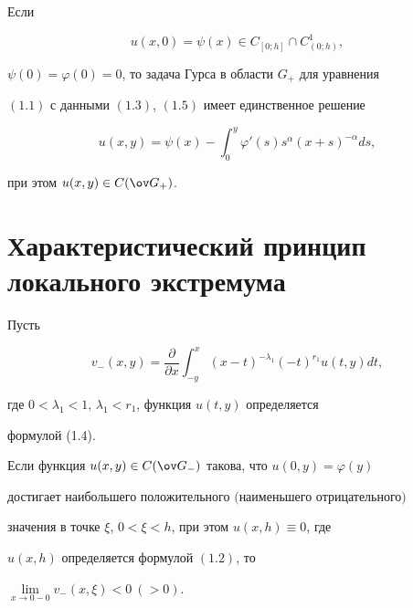  


\begin{thm} 


Если 


\begin{equation} 


u(x,0)=\psi(x)\in C_{[0;h]}\cap C^1_{(0;h)}, 


\end{equation} 


$\psi(0)=\varphi(0)=0$, то задача Гурса в области $G_+$ для уравнения 


$(1.1)$ с данными $(1.3)$, $(1.5)$ имеет единственное решение 


\begin{equation} 


u(x,y)=\psi(x)-\int^y_0 \varphi'(s)s^\alpha(x+s)^{-\alpha}d s, 


\end{equation} 


при этом $u(x,y)\in C(\ov G_+)$.\end{thm} 


 


\section{Характеристический принцип локального экстремума} 


 


Пусть 


$$ 


v_-(x,y)=\frac{\partial}{\partial x}\int^x_{-y} 


(x-t)^{-\lambda_1}(-t)^{r_1}u(t,y)d t, 


$$ 


где $0<\lambda_1<1$, $\lambda_1<r_1$, функция $u(t,y)$ определяется 


формулой (1.4). 


 


\begin{lem} 


Если функция $u(x,y)\in C(\ov G_-)$ такова, что $u(0,y)=\varphi(y)$ 


достигает наибольшего положительного $($наименьшего отрицательного$)$ 


значения в точке $\xi$, $0<\xi<h$, при этом $u(x,h)\equiv0$, где 


$u(x,h)$ определяется формулой $(1.2)$, то 


$\lim\limits_{x\to0-0}v_-(x,\xi)<0\ (>0)$. 


\end{lem} 



